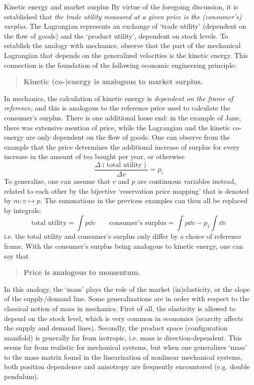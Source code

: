 \begin{econ}{Kinetic energy and market surplus}
   By virtue of the foregoing discussion, it is established that \emph{the trade utility measured at a given price is the (consumer's) surplus}. The Lagrangian represents an exchange of `trade utility' (dependent on the flow of goods) and the `product utility', dependent on stock levels. To establish the analogy with mechanics, observe that the part of the mechanical Lagrangian that depends on the generalized velocities is the kinetic energy. This connection is the foundation of the following economic engineering principle:
    \begin{quote}
        \textbf{Kinetic (co-)energy is analogous to market surplus.}
    \end{quote}
    In mechanics, the calculation of kinetic energy is \emph{dependent on the frame of reference}, and this is analogous to the reference price used to calculate the consumer's surplus. There is one additional loose end: in the example of Jane, there was extensive mention of price, while the Lagrangian and the kinetic co-energy are only dependent on the flow of goods. One can observe from the example that the price determines the additional increase of surplus for every increase in the amount of tea bought per year, or otherwise
    $$
        \frac{\Delta (\text{total utility})}{\Delta v} = p_i
    $$
    To generalize, one can assume that $v$ and $p$ are continuous variables instead, related to each other by the bijective `reservation price mapping' that is denoted by $m: v \mapsto p$. The summations in the previous examples can then all be replaced by integrals:
    $$ 
        \text{total utility} = \int p\dd{v} \qquad 
        \text{consumer's surplus} = \int p\dd{v} - p_1\int \dd{v}
    $$ 
    i.e. the total utility and consumer's surplus only differ by a choice of reference frame. With the consumer's surplus being analogous to kinetic energy, one can say that
    \begin{quote}
        \textbf{Price is analogous to momentum.}
    \end{quote}
    In this analogy, the `mass' plays the role of the market (in)elasticity, or the slope of the supply/demand line. Some generalizations are in order with respect to the classical notion of mass in mechanics. First of all, the elasticity is allowed to depend on the stock level, which is very common in economics (scarcity affects the supply and demand lines). Secondly, the product space (configuration manifold) is generally far from isotropic, i.e. mass is direction-dependent. This seems far from realistic for mechanical systems, but when one generalizes `mass' to the mass matrix found in the linearization of nonlinear mechanical systems, both position dependence and anisotropy are frequently encountered (e.g. double pendulum).
\end{econ}

